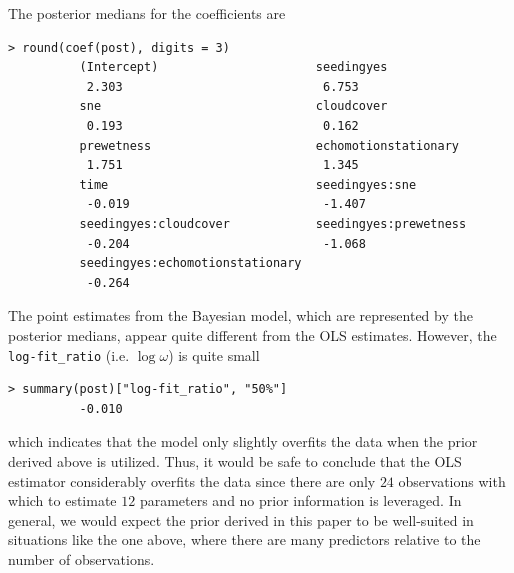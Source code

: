 \documentclass[11pt]{article}
\begin{document}
The posterior medians for the coefficients are

\begin{lstlisting}
> round(coef(post), digits = 3)
          (Intercept)                      seedingyes
           2.303                            6.753
          sne                              cloudcover
           0.193                            0.162
          prewetness                       echomotionstationary
           1.751                            1.345
          time                             seedingyes:sne
           -0.019                           -1.407
          seedingyes:cloudcover            seedingyes:prewetness
           -0.204                           -1.068
          seedingyes:echomotionstationary
           -0.264
\end{lstlisting}


The point estimates from the Bayesian model, which are represented by the
posterior medians, appear quite different from the OLS estimates. However, the
{\tt log-fit\_ratio} (i.e. $\log{\omega}$) is quite small

\begin{lstlisting}
> summary(post)["log-fit_ratio", "50%"]
          -0.010
\end{lstlisting}

which indicates that the model only slightly overfits the data when the prior
derived above is utilized. Thus, it would be safe to conclude that the OLS
estimator considerably overfits the data since there are only $24$ observations
with which to estimate $12$ parameters and no prior information is leveraged. In
general, we would expect the prior derived in this paper to be well-suited in
situations like the one above, where there are many predictors relative to the
number of observations.



\end{document}

